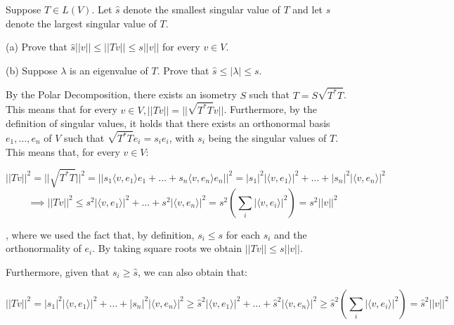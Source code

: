  \begin{exercise}{18}
     Suppose $T \in L(V)$. Let $\hat{s}$ denote the smallest singular value of $T$ and let $s$ denote the largest singular value of $T$.

     (a) Prove that $\hat{s}\lvert \lvert v \rvert \rvert \leq \lvert \lvert Tv \rvert \rvert \leq s \lvert \lvert v \rvert \rvert$ for every $v \in V$.

     (b) Suppose $\lambda$ is an eigenvalue of $T$. Prove that $\hat{s} \leq \lvert \lambda \rvert \leq s$.
 \end{exercise}

 \begin{solution}

     By the Polar Decomposition, there exists an isometry $S$ such that $T = S\sqrt{T^*T}$. This means that for every $v \in V, \lvert \lvert Tv \rvert \rvert = \lvert \lvert \sqrt{T^*T} v\rvert \rvert$. Furthermore, by the definition of singular values, it holds that there exists an orthonormal basis $e_1, \ldots, e_n$ of $V$ such that $\sqrt{T^*T}e_i = s_i e_i$, with $s_i$ being the singular values of $T$. This means that, for every $v \in V$:

     $$\lvert \lvert Tv \rvert \rvert^2 = \lvert \lvert \sqrt{T^*T} \rvert \rvert^2 = \lvert \lvert s_1 \langle v, e_1 \rangle e_1 + \ldots + s_n \langle v, e_n \rangle e_n \rvert \rvert^2 = \lvert s_1 \rvert^2 \lvert \langle v, e_1 \rangle \rvert^2 + \ldots + \lvert s_n \rvert^2 \lvert \langle v, e_n \rangle \rvert^2$$
     $$\implies \lvert \lvert Tv \rvert \rvert^2 \leq s^2 \lvert \langle v, e_1 \rangle \rvert^2 + \ldots + s^2\lvert \langle v, e_n \rangle \rvert^2 = s^2(\sum_i \lvert \langle v, e_i \rangle \rvert^2) = s^2 \lvert \lvert v \rvert \rvert^2$$

     , where we used the fact that, by definition, $s_i \leq s$ for each $s_i$ and the orthonormality of $e_i$. By taking square roots we obtain $\lvert \lvert Tv \rvert \rvert \leq s \lvert \lvert v \rvert \rvert$.

     Furthermore, given that $s_i \geq \hat{s}$, we can also obtain that:

     $$\lvert \lvert Tv \rvert \rvert^2 =  \lvert s_1 \rvert^2 \lvert \langle v, e_1 \rangle \rvert^2 + \ldots + \lvert s_n \rvert^2 \lvert \langle v, e_n \rangle \rvert^2 \geq \hat{s}^2 \lvert \langle v, e_1 \rangle \rvert^2 + \ldots + \hat{s}^2 \lvert \langle v, e_n \rangle \rvert^2 \geq \hat{s}^2(\sum_i \lvert \langle v, e_i \rangle \rvert^2) = \hat{s}^2 \lvert \lvert v \rvert \rvert^2$$


\end{solution}
